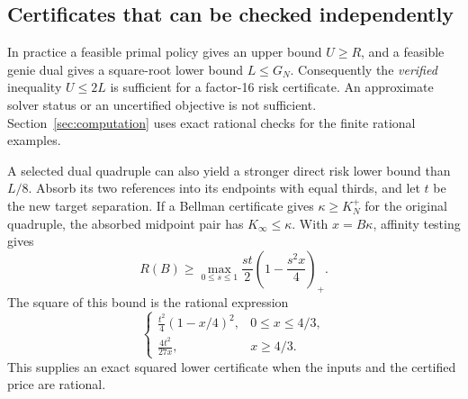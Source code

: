 \subsection{Certificates that can be checked independently}

In practice a feasible primal policy gives an upper bound $U\ge R$, and
a feasible genie dual gives a square-root lower bound $L\le G_N$.
Consequently the \emph{verified} inequality $U\le2L$ is sufficient for
a factor-16 risk certificate. An approximate solver status or an
uncertified objective is not sufficient. Section~\ref{sec:computation}
uses exact rational checks for the finite rational examples.

A selected dual quadruple can also yield a stronger direct risk lower
bound than $L/8$. Absorb its two references into its endpoints with equal
thirds, and let $t$ be the new target separation. If a Bellman certificate
gives $\kappa\ge K_N^+$ for the original quadruple, the absorbed midpoint
pair has $K_\infty\le\kappa$. With $x=B\kappa$, affinity testing gives
\begin{equation}\label{eq:direct-genie-risk}
 R(B)\ge\max_{0\le s\le1}
          \frac{st}{2}\left(1-\frac{s^2x}{4}\right)_+.
\end{equation}
The square of this bound is the rational expression
\begin{equation}\label{eq:direct-genie-risk-squared}
 \begin{cases}
 \displaystyle\frac{t^2}{4}(1-x/4)^2,&0\le x\le4/3,\\[4pt]
 \displaystyle\frac{4t^2}{27x},&x\ge4/3.
 \end{cases}
\end{equation}
This supplies an exact squared lower certificate when the inputs and
the certified price are rational.
